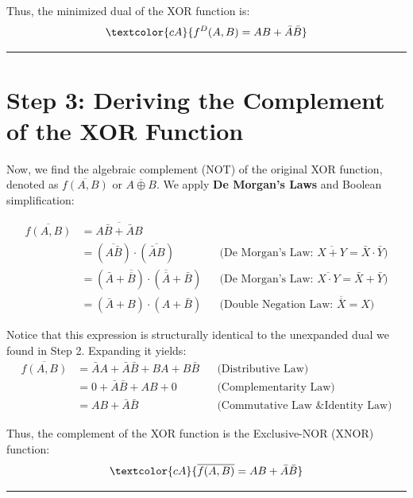 \documentclass[12pt,a3paper]{article}
\begin{document}
\begin{enumerate}
\begin{tcolorbox}[enhanced,breakable,ansbox,colback=cA!4,colframe=cA,boxrule=0.8pt,arc=5pt,title={\textbf{Answer}},fonttitle=\bfseries\color{white},colbacktitle=cA]
Thus, the minimized dual of the XOR function is:
\begin{equation}
    \textcolor{cA}{f^D(A, B) = AB + \bar{A}\bar{B}}
\end{equation}

\vspace{0.2cm}
\hrule
\vspace{0.4cm}

\section*{Step 3: Deriving the Complement of the XOR Function}

Now, we find the algebraic complement (NOT) of the original XOR function, denoted as $\overline{f(A, B)}$ or $\overline{A \oplus B}$. We apply \textbf{De Morgan's Laws} and Boolean simplification:

\begin{align*}
    \overline{f(A, B)} &= \overline{A\bar{B} + \bar{A}B} \\
    &= (\overline{A\bar{B}}) \cdot (\overline{\bar{A}B}) && \text{(De Morgan's Law: } \overline{X + Y} = \bar{X} \cdot \bar{Y} \text{)} \\
    &= (\bar{A} + \overline{\overline{B}}) \cdot (\overline{\overline{A}} + \bar{B}) && \text{(De Morgan's Law: } \overline{X \cdot Y} = \bar{X} + \bar{Y} \text{)} \\
    &= (\bar{A} + B) \cdot (A + \bar{B}) && \text{(Double Negation Law: } \overline{\overline{X}} = X \text{)}
\end{align*}

Notice that this expression is structurally identical to the unexpanded dual we found in Step 2. Expanding it yields:
\begin{align*}
    \overline{f(A, B)} &= \bar{A}A + \bar{A}\bar{B} + BA + B\bar{B} && \text{(Distributive Law)} \\
    &= 0 + \bar{A}\bar{B} + AB + 0 && \text{(Complementarity Law)} \\
    &= AB + \bar{A}\bar{B} && \text{(Commutative Law \& Identity Law)}
\end{align*}

Thus, the complement of the XOR function is the Exclusive-NOR (XNOR) function:
\begin{equation}
    \textcolor{cA}{\overline{f(A, B)} = AB + \bar{A}\bar{B}}
\end{equation}

\vspace{0.2cm}
\hrule
\vspace{0.4cm}


\end{tcolorbox}
\end{enumerate}
\end{document}
